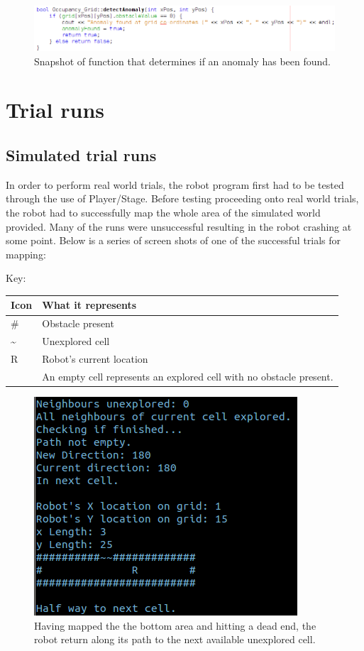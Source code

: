 \documentclass[a4paper,12pt]{article}
\begin{document}
\begin{figure}[H]
\includegraphics[scale=0.65]{Detect_Anomaly_SS.png}
\caption{Snapshot of function that determines if an anomaly has been found.}
\end{figure}

\section{Trial runs}

\subsection{Simulated trial runs}
\noindent In order to perform real world trials, the robot program first had to be tested through the use of Player/Stage. Before testing proceeding onto real world trials, the robot had to successfully map the whole area of the simulated world provided. Many of the runs were unsuccessful resulting in the robot crashing at some point. Below is a series of screen shots of one of the successful trials for mapping:

\vspace{5mm}
\noindent Key:
\begin{table}[H]
\begin{tabular}{| l | l |}
	\hline
	\textbf{Icon} & \textbf{What it represents}
	\\\hline
	\# & Obstacle present
	\\\hline
	\textasciitilde & Unexplored cell
	\\\hline
	R & Robot's current location
	\\\hline
	 & An empty cell represents an explored cell with no obstacle present.
	\\\hline
\end{tabular}
\end{table}

\begin{figure}[H]
\includegraphics[scale=1.0]{RunT1.png}
\caption{Having mapped the the bottom area and hitting a dead end, the robot return along its path to the next available unexplored cell.}
\end{figure}
\end{document}
